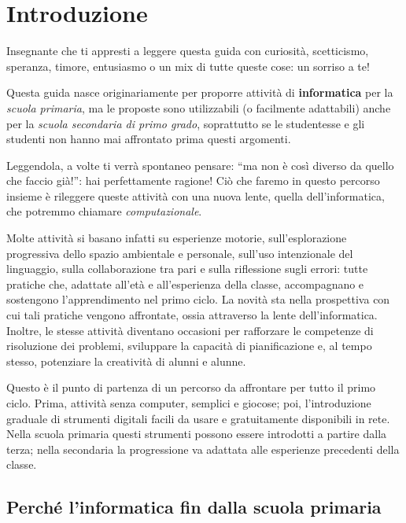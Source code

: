 \chapter{Introduzione}\label{capitolo-1-introduzione}

Insegnante che ti appresti a leggere questa guida con curiosità, scetticismo, speranza, timore, entusiasmo o un mix di tutte queste cose: un sorriso a te! 

Questa guida nasce originariamente per proporre attività di \textbf{informatica} per la \textit{scuola primaria}, ma le proposte sono utilizzabili (o facilmente adattabili) anche per la \textit{scuola secondaria di primo grado}, soprattutto se le studentesse e gli studenti non hanno mai affrontato prima questi argomenti.

Leggendola, a volte ti verrà spontaneo pensare: ``ma non è così diverso da quello che faccio già!'': hai perfettamente ragione! Ciò che faremo in questo percorso insieme è rileggere queste attività  con una nuova lente, quella dell'informatica, che potremmo chiamare \emph{computazionale}.

Molte attività si basano infatti su esperienze motorie, sull'esplorazione progressiva dello spazio ambientale e personale, sull'uso intenzionale del linguaggio, sulla collaborazione tra pari e sulla riflessione sugli errori: tutte pratiche che, adattate all'età e all'esperienza della classe, accompagnano e sostengono l'apprendimento nel primo ciclo. La novità sta nella prospettiva con cui tali pratiche vengono affrontate, ossia attraverso la lente dell'informatica. Inoltre, le stesse attività diventano occasioni per rafforzare le competenze di risoluzione dei problemi, sviluppare la capacità di pianificazione e, al tempo stesso, potenziare la creatività di alunni e alunne.

Questo è il punto di partenza di un percorso da affrontare per tutto il primo ciclo. Prima, attività senza computer, semplici e giocose; poi, l'introduzione graduale di strumenti digitali facili da usare e gratuitamente disponibili in rete. Nella scuola primaria questi strumenti possono essere introdotti a partire dalla terza; nella secondaria la progressione va adattata alle esperienze precedenti della classe.

\section{Perché l'informatica fin dalla scuola primaria }\label{perchuxe9-linformatica-fin-dalla-scuola-primaria}

